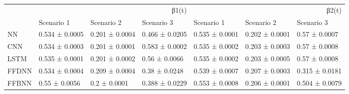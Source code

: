 \begin{tabular}{lllllll}
\toprule
 & \multicolumn{3}{r}{β1(t)} & \multicolumn{3}{r}{β2(t)} \\
 & Scenario 1 & Scenario 2 & Scenario 3 & Scenario 1 & Scenario 2 & Scenario 3 \\
\midrule
NN & 0.534 ± 0.0005 & 0.201 ± 0.0004 & 0.466 ± 0.0205 & 0.535 ± 0.0001 & 0.202 ± 0.0001 & 0.57 ± 0.0007 \\
CNN & 0.534 ± 0.0003 & 0.201 ± 0.0001 & 0.583 ± 0.0002 & 0.535 ± 0.0002 & 0.203 ± 0.0003 & 0.57 ± 0.0008 \\
LSTM & 0.535 ± 0.0001 & 0.201 ± 0.0002 & 0.56 ± 0.0066 & 0.535 ± 0.0002 & 0.203 ± 0.0005 & 0.57 ± 0.0008 \\
FFDNN & 0.534 ± 0.0004 & 0.209 ± 0.0004 & 0.38 ± 0.0248 & 0.539 ± 0.0007 & 0.207 ± 0.0003 & 0.315 ± 0.0181 \\
FFBNN & 0.55 ± 0.0056 & 0.2 ± 0.0001 & 0.388 ± 0.0229 & 0.553 ± 0.0008 & 0.206 ± 0.0001 & 0.504 ± 0.0079 \\
\bottomrule
\end{tabular}
